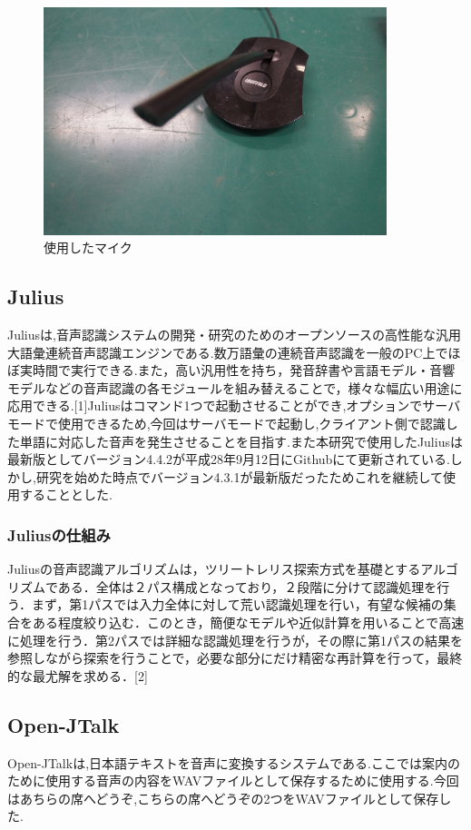 \documentclass[12pt,oneside]{sotsuken_paper}
\begin{document}
\begin{figure}[htbp]
\begin{center}
\includegraphics[width=100mm]{img/mic.JPG}
\caption{使用したマイク}
\label{fig:mic}
\end{center}
\end{figure}


\subsection{Julius}
Juliusは,音声認識システムの開発・研究のためのオープンソースの高性能な汎用大語彙連続音声認識エンジンである.数万語彙の連続音声認識を一般のPC上でほぼ実時間で実行できる.また，高い汎用性を持ち，発音辞書や言語モデル・音響モデルなどの音声認識の各モジュールを組み替えることで，様々な幅広い用途に応用できる.[1]Juliusはコマンド1つで起動させることができ,オプションでサーバモードで使用できるため,今回はサーバモードで起動し,クライアント側で認識した単語に対応した音声を発生させることを目指す.また本研究で使用したJuliusは最新版としてバージョン4.4.2が平成28年9月12日にGithubにて更新されている.しかし,研究を始めた時点でバージョン4.3.1が最新版だったためこれを継続して使用することとした.

\subsubsection{Juliusの仕組み}
Juliusの音声認識アルゴリズムは，ツリートレリス探索方式を基礎とするアルゴリズムである．全体は２パス構成となっており，２段階に分けて認識処理を行う．まず，第1パスでは入力全体に対して荒い認識処理を行い，有望な候補の集合をある程度絞り込む．このとき，簡便なモデルや近似計算を用いることで高速に処理を行う．第2パスでは詳細な認識処理を行うが，その際に第1パスの結果を参照しながら探索を行うことで，必要な部分にだけ精密な再計算を行って，最終的な最尤解を求める．[2]


\subsection{Open-JTalk}
Open-JTalkは,日本語テキストを音声に変換するシステムである.ここでは案内のために使用する音声の内容をWAVファイルとして保存するために使用する.今回はあちらの席へどうぞ,こちらの席へどうぞの2つをWAVファイルとして保存した.
\end{document}
